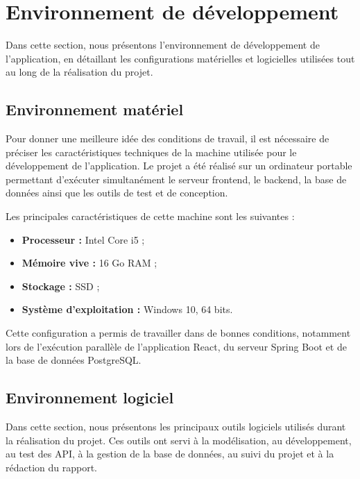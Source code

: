 ﻿\documentclass[12pt,a4paper]{report}
\begin{document}
\section{Environnement de développement}

Dans cette section, nous présentons l'environnement de développement de
l'application, en détaillant les configurations matérielles et logicielles
utilisées tout au long de la réalisation du projet.

\subsection{Environnement matériel}

Pour donner une meilleure idée des conditions de travail, il est nécessaire
de préciser les caractéristiques techniques de la machine utilisée pour le
développement de l'application. Le projet a été réalisé sur un ordinateur
portable permettant d'exécuter simultanément le serveur frontend, le backend,
la base de données ainsi que les outils de test et de conception.

Les principales caractéristiques de cette machine sont les suivantes :

\begin{itemize}
    \item \textbf{Processeur :} Intel Core i5 ;
    \item \textbf{Mémoire vive :} 16 Go RAM ;
    \item \textbf{Stockage :} SSD ;
    \item \textbf{Système d'exploitation :} Windows 10, 64 bits.
\end{itemize}

Cette configuration a permis de travailler dans de bonnes conditions,
notamment lors de l'exécution parallèle de l'application React, du serveur
Spring Boot et de la base de données PostgreSQL.

\subsection{Environnement logiciel}

Dans cette section, nous présentons les principaux outils logiciels utilisés
durant la réalisation du projet. Ces outils ont servi à la modélisation, au
développement, au test des API, à la gestion de la base de données, au suivi
du projet et à la rédaction du rapport.

\end{document}
